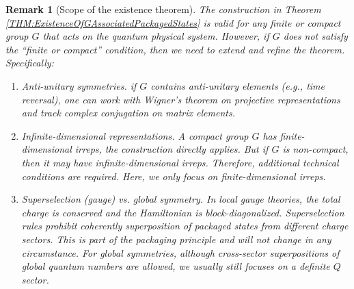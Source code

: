 \documentclass[12pt,a4paper]{article}
\newtheorem{remark}{Remark}
\begin{document}
\begin{remark}[Scope of the existence theorem]
	The construction in Theorem \ref{THM:ExistenceOfGAssociatedPackagedStates} is valid for any finite or compact group $G$ that acts on the quantum physical system.	
	However, if $G$ does not satisfy the ``finite or compact'' condition, then we need to extend and refine the theorem.
	Specifically:
	\begin{enumerate}
		\item Anti-unitary symmetries.
		if $G$ contains anti-unitary elements (e.g., time reversal), one can work with Wigner’s theorem on projective representations and track complex conjugation on matrix elements.
		
		\item Infinite-dimensional representations.
		A compact group $G$ has finite-dimensional irreps, the construction directly applies.
		But if $G$ is non-compact, then it may have infinite-dimensional irreps.
		Therefore, additional technical conditions are required.
		Here, we only focus on finite-dimensional irreps.
		
		\item Superselection (gauge) vs. global symmetry.
		In local gauge theories, the total charge is conserved and the Hamiltonian is block-diagonalized.
		Superselection rules prohibit coherently superposition of packaged states from different charge sectors.
		This is part of the packaging principle and will not change in any circumstance.
		For global symmetries, although cross-sector superpositions of global quantum numbers are allowed, we usually still focuses on a definite $Q$ sector.
	\end{enumerate}
\end{remark}
\end{document}
